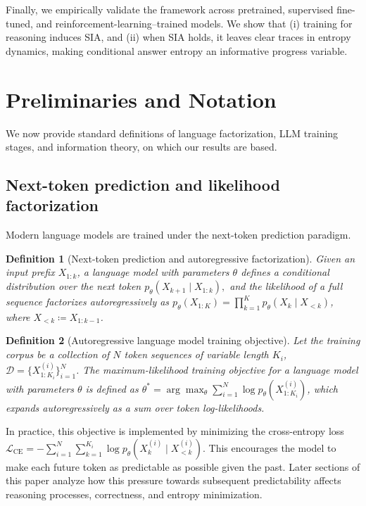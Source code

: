 \documentclass{article}
\newtheorem{definition}{Definition}
\begin{document}
Finally, we empirically validate the framework across pretrained, supervised fine-tuned, and reinforcement-learning–trained models. We show that (i) training for reasoning induces SIA, and (ii) when SIA holds, it leaves clear traces in entropy dynamics, making conditional answer entropy an informative progress variable.
\section{Preliminaries and Notation}
\label{sec:preliminaries}
We now provide standard definitions of language factorization, LLM training stages, and information theory, on which our results are based.
\subsection{Next-token prediction and likelihood factorization}

Modern language models are trained under the next-token prediction paradigm. 

\begin{definition}[Next-token prediction and autoregressive factorization]
Given an input prefix $X_{1:k}$, a language model with parameters $\theta$ defines a conditional distribution over the next token $p_\theta(X_{k+1}\mid X_{1:k}),$ and the likelihood of a full sequence factorizes autoregressively as $p_\theta(X_{1:K})=\prod_{k=1}^{K} p_\theta(X_k \mid X_{<k})$, where $X_{<k} \coloneqq X_{1:k-1}$.
\end{definition}

\begin{definition}[Autoregressive language model training objective]
Let the training corpus be a collection of $N$ token sequences of variable length $K_i$, $\mathcal{D}=\{X_{1:K_i}^{(i)}\}_{i=1}^N$. The maximum-likelihood training objective for a language model with parameters $\theta$ is defined as $\theta^\ast= \arg \max_\theta \sum^N_{i=1}\log p_\theta(X_{1:K_i}^{(i)})$, which expands autoregressively as a sum over token log-likelihoods.
\end{definition}

In practice, this objective is implemented  by minimizing the cross-entropy loss $\mathcal{L}_{\text{CE}}=-\sum^N_{i=1}\sum^{K_i}_{k=1}\log p_\theta(X_k^{(i)} \mid X_{<k}^{(i)}).$ This encourages the model to make each future token as predictable as possible given the past. Later sections of this paper analyze how this pressure towards subsequent predictability affects reasoning processes, correctness, and entropy minimization.
\end{document}

